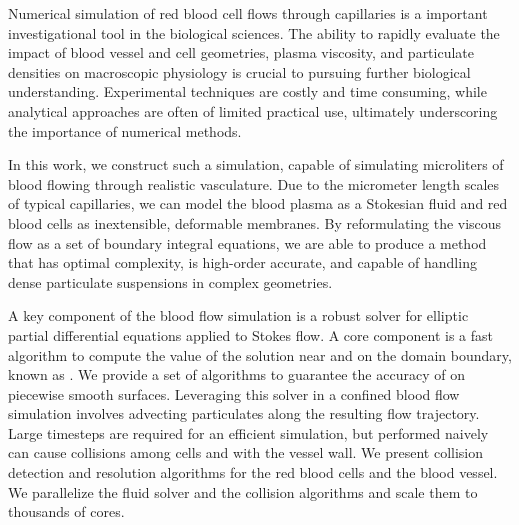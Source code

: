 
Numerical simulation of red blood cell flows through capillaries is a important investigational tool in the biological sciences.
The ability to rapidly evaluate the impact of blood vessel and cell geometries, plasma viscosity, and particulate densities on macroscopic physiology is crucial to pursuing further biological understanding. 
Experimental techniques are costly and time consuming, while analytical approaches are often of limited practical use, ultimately underscoring the importance of numerical methods.

In this work, we construct such a simulation, capable of simulating microliters of blood flowing through realistic vasculature.
Due to the micrometer length scales of typical capillaries, we can model the blood plasma as a Stokesian fluid and red blood cells as inextensible, deformable membranes.
By reformulating the viscous flow as a set of boundary integral equations, we are able to produce a method that has optimal complexity, is high-order accurate, and capable of handling dense particulate suspensions in complex geometries.

A key component of the blood flow simulation is a robust solver for elliptic partial differential equations applied to Stokes flow.
A core component is a fast algorithm to compute the value of the solution near and on the domain boundary, known as \qbkix.
We provide a set of algorithms to guarantee the accuracy of \qbkix on piecewise smooth surfaces.
Leveraging this solver in a confined blood flow simulation involves advecting particulates along the resulting flow trajectory. 
Large timesteps are required for an efficient simulation, but performed naively can cause collisions among cells and with the vessel wall. 
We present collision detection and resolution algorithms for the red blood cells and the blood vessel.
We parallelize the fluid solver and the collision algorithms and scale them to thousands of cores.

